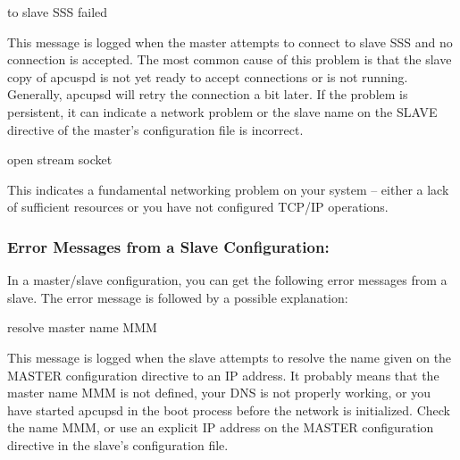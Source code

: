 {{{{{{{{{\label{Connect-to-slave-SSS-failed}

{\smallConnect to slave SSS failed}

This message is logged when the master attempts to connect to slave SSS and no
connection is accepted. The most common cause of this problem is that the
slave copy of apcuspd is not yet ready to accept connections or is not
running. Generally, apcupsd will retry the connection a bit later. If the
problem is persistent, it can indicate a network problem or the slave name on
the SLAVE directive of the master's configuration file is incorrect. 

\label{Cannot-open-stream-socket}

{\smallCannot open stream socket}

This indicates a fundamental networking problem on your system {--} either a
lack of sufficient resources or you have not configured TCP/IP operations. 

\label{Error-Messages-from-a-Slave-Configuration}

\subsubsection*{Error Messages from a Slave Configuration:}

In a master/slave configuration, you can get the following error messages from
a slave. The error message is followed by a possible explanation: 

\label{Cannot-resolve-master-name-MMM}

{\smallCannot resolve master name MMM}

This message is logged when the slave attempts to resolve the name given on
the MASTER configuration directive to an IP address. It probably means that
the master name MMM is not defined, your DNS is not properly working, or you
have started apcupsd in the boot process before the network is initialized.
Check the name MMM, or use an explicit IP address on the MASTER configuration
directive in the slave's configuration file. 

\label{Cannot-bind-local-address_003b-probably-already-in-use}

}}}}}}}}}
